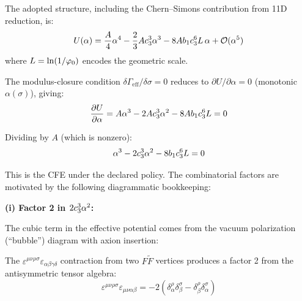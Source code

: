 The adopted structure, including the Chern--Simons contribution from 11D reduction, is:
\begin{equation}
    U(\alpha) = \frac{A}{4}\alpha^4 - \frac{2}{3}Ac_3^3\alpha^3 
        - 8Ab_1c_3^6 L\,\alpha + \mathcal{O}(\alpha^5)
    \label{eq:potential}
\end{equation}
where $L = \ln(1/\varphi_0)$ encodes the geometric scale.

The modulus-closure condition $\delta\Gamma_{\mathrm{eff}}/\delta\sigma=0$ reduces to
$\partial U/\partial\alpha = 0$ (monotonic $\alpha(\sigma)$), giving:
\begin{equation}
    \frac{\partial U}{\partial\alpha} = A\alpha^3 - 2Ac_3^3\alpha^2 
        - 8Ab_1c_3^6 L = 0
    \label{eq:stationarity}
\end{equation}

Dividing by $A$ (which is nonzero):
\begin{equation}
    \alpha^3 - 2c_3^3\alpha^2 - 8b_1c_3^6 L = 0
    \label{eq:CFE-appendix}
\end{equation}

This is the CFE under the declared policy. The combinatorial factors are motivated by
the following diagrammatic bookkeeping:

\textbf{(i) Factor 2 in $2c_3^3\alpha^2$:}

The cubic term in the effective potential comes from the vacuum polarization 
(``bubble'') diagram with axion insertion:
\begin{center}
\end{center}
The $\varepsilon^{\mu\nu\rho\sigma}\varepsilon_{\alpha\beta\gamma\delta}$ contraction from two 
$F\tilde{F}$ vertices produces a factor 2 from the antisymmetric tensor algebra:
\begin{equation}
    \varepsilon^{\mu\nu\rho\sigma}\varepsilon_{\mu\nu\alpha\beta} = -2(\delta^\rho_\alpha\delta^\sigma_\beta - \delta^\rho_\beta\delta^\sigma_\alpha)
\end{equation}

